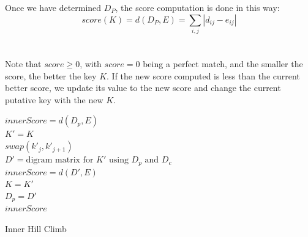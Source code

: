 \documentclass[Lau,binding=0.6cm,oneside]{sapthesis}
\begin{document}
Once we have determined $D_P$, the score computation is done in this way:\\

\begin{equation}
score{(K)} = d{(D_P, E)} = \sum_{i,j} |d_{ij} - e_{ij}|
\end{equation}
\ \\\\
Note that $score \geq 0$, with $score = 0$ being a perfect match, and the smaller the score, the better the key $K$. If the new score computed is less than the current better score, we update its value to the new score and change the current putative key with the new $K$.\\ 
\begin{algorithm}[H]
	$innerScore = d(D_p, E)$\\
	{
		{
			$K' = K$\\
			$swap(k'_j, k'_{j+1})$\\
			$D' = \text{digram matrix for } K' \text{ using } D_p \text{ and } D_c$\\
			{
				$innerScore = d(D', E)$\\
				$K = K'$\\
				$D_p = D'$\\
			}
		}
	}
	\Return $innerScore$
	\caption{Inner Hill Climb}
\end{algorithm}
\ \\
\end{document}
